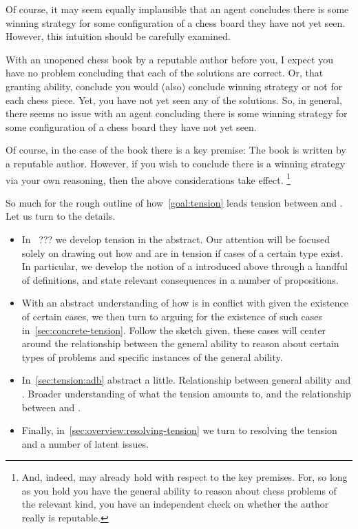 \begin{note}[Ability]
  Of course, it may seem equally implausible that an agent concludes there is some winning strategy for some configuration of a chess board they have not yet seen.
  However, this intuition should be carefully examined.

  With an unopened chess book by a reputable author before you, I expect you have no problem concluding that each of the solutions are correct.
  {
    \color{red}
    Or, that granting ability, conclude you would (also) conclude winning strategy or not for each chess piece.
  }
  Yet, you have not yet seen any of the solutions.
  So, in general, there seems no issue with an agent concluding there is some winning strategy for some configuration of a chess board they have not yet seen.

  Of course, in the case of the book there is a key premise:
  The book is written by a reputable author.
  However, if you wish to conclude there is a winning strategy via your own reasoning, then the above considerations take effect.%
  \footnote{
    And, indeed, may already hold with respect to the key premises.
    For, so long as you hold you have the general ability to reason about chess problems of the relevant kind, you have an independent check on whether the author really is reputable.
  }
\end{note}

\begin{note}[Moving on]
  So much for the rough outline of how~\autoref{goal:tension} leads tension between \csN{} and \ESU{}.
  Let us turn to the details.

  {
    \color{red}
    \begin{itemize}
    \item
      In~{\color{red} ???} we develop tension in the abstract.
      Our attention will be focused solely on drawing out how \csN{} and \ESU{} are in tension if cases of a certain type exist.
      In particular, we develop the notion of a \cluster{} introduced above through a handful of definitions, and state relevant consequences in a number of propositions.
    \item
      With an abstract understanding of how \csN{} is in conflict with \ESU{} given the existence of certain cases, we then turn to arguing for the existence of such cases in~\autoref{sec:concrete-tension}.
      Follow the sketch given, these cases will center around the relationship between the general ability to reason about certain types of problems and specific instances of the general ability.
    \item
      In~\autoref{sec:tension:adb} abstract a little.
      Relationship between general ability and .
      Broader understanding of what the tension amounts to, and the relationship between \EAS{} and \adB{}.
    \item
      Finally, in~\autoref{sec:overview:resolving-tension} we turn to resolving the tension and a number of latent issues.
    \end{itemize}
  }
\end{note}

